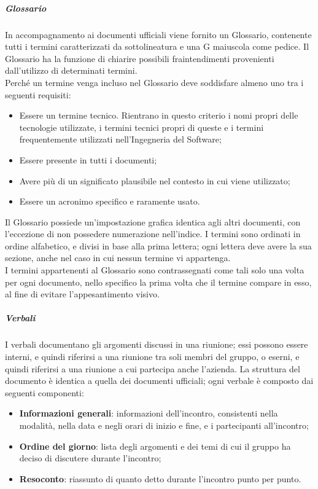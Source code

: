 \documentclass[../norme-di-progetto.tex]{subfiles}
\begin{document}
\subparagraph{Glossario}
In accompagnamento ai documenti ufficiali viene fornito un Glossario, contenente tutti i termini caratterizzati da sottolineatura e una G maiuscola come pedice. Il Glossario ha la funzione di chiarire possibili fraintendimenti provenienti dall'utilizzo di determinati termini. \\
Perché un termine venga incluso nel Glossario deve soddisfare almeno uno tra i seguenti requisiti:
\begin{itemize}
  \item Essere un termine tecnico. Rientrano in questo criterio i nomi propri delle tecnologie utilizzate, i termini tecnici propri di queste e i termini frequentemente utilizzati nell'Ingegneria del Software;
  \item Essere presente in tutti i documenti;
  \item Avere più di un significato plausibile nel contesto in cui viene utilizzato;
  \item Essere un acronimo specifico e raramente usato.
\end{itemize}
Il Glossario possiede un'impostazione grafica identica agli altri documenti, con l'eccezione di non possedere numerazione nell'indice. I termini sono ordinati in ordine alfabetico, e divisi in base alla prima lettera; ogni lettera deve avere la sua sezione, anche nel caso in cui nessun termine vi appartenga. \\
I termini appartenenti al Glossario sono contrassegnati come tali solo una volta per ogni documento, nello specifico la prima volta che il termine compare in esso, al fine di evitare l'appesantimento visivo.

\subparagraph{Verbali}
I verbali documentano gli argomenti discussi in una riunione; essi possono essere interni, e quindi riferirsi a una riunione tra soli membri del gruppo, o eserni, e quindi riferirsi a una riunione a cui partecipa anche l'azienda. La struttura del documento è identica a quella dei documenti ufficiali; ogni verbale è composto dai seguenti componenti:
\begin{itemize}
  \item \textbf{Informazioni generali}: informazioni dell'incontro, consistenti nella modalità, nella data e negli orari di inizio e fine, e i partecipanti all'incontro;
  \item \textbf{Ordine del giorno}: lista degli argomenti e dei temi di cui il gruppo ha deciso di discutere durante l'incontro;
  \item \textbf{Resoconto}: riassunto di quanto detto durante l'incontro punto per punto.
\end{itemize}
\end{document}
